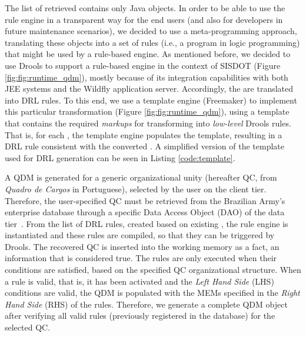 The list of retrieved \callers contains only Java objects. 
In order to be able to use the rule engine in a transparent way for the end users 
(and also for developers in future maintenance scenarios), we decided to use a 
meta-programming approach, translating these objects into a set of rules (i.e., a program in 
logic programming) that might be used by a rule-based engine. As mentioned before,  
we decided to use Drools to support a rule-based engine in the context of 
SISDOT (Figure \ref{fig:fig:runtime_qdm}), mostly because of its integration capabilities 
with both JEE systems and the Wildfly application server. Accordingly,  
the \callers are translated into DRL rules. To this end, we use a template engine (Freemaker) 
to implement this particular transformation (Figure \ref{fig:fig:runtime_qdm}), using a template 
that contains the required \emph{markups} for transforming \shc into \emph{low-level} Drools 
rules. That is, for each \shc, the template engine populates the template, 
resulting in a DRL rule consistent with the converted \shc.
{\color{red}A simplified version of the template used for DRL generation can be seen in} Listing \ref{code:template}.



A QDM is generated for a generic organizational unity (hereafter QC, from \emph{Quadro de Cargos} in Portuguese), 
selected by the user on the client tier. 
Therefore, the user-specified QC must be retrieved from the Brazilian Army's enterprise database  
through a specific Data Access Object (DAO) of the data tier~\cite{alur2003}.
From the list of DRL rules, created based on existing \callers, the rule engine is instantiated and these rules are compiled, 
so that they can be triggered by Drools. The recovered QC is inserted into the working memory as a fact,  an 
information that is considered true. The rules are only executed when their conditions are satisfied, 
based on the specified QC organizational structure. When a rule is valid, that is, it has been activated 
and the \emph{Left Hand Side} (LHS) conditions are valid, 
the QDM is populated with the MEMs specified in the \emph{Right Hand Side} (RHS) of the rules. Therefore, we generate a 
complete QDM object after verifying all valid rules (previously registered in the database) for 
the selected QC. 

